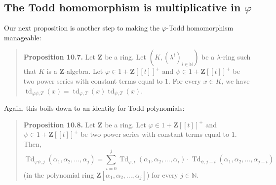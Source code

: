 \documentclass[numbers=enddot,12pt,final,onecolumn,notitlepage]{scrartcl}%
\begin{document}
\subsection{The Todd homomorphism is multiplicative in $\varphi$}

Our next proposition is another step to making the $\varphi$-Todd homomorphism manageable:

\begin{quote}
\textbf{Proposition 10.7.} Let $\mathbf{Z}$ be a ring. Let $\left(  K,\left(
\lambda^{i}\right)  _{i\in\mathbb{N}}\right)  $ be a $\lambda$-ring such that
$K$ is a $\mathbf{Z}$-algebra. Let $\varphi\in1+\mathbf{Z}\left[  \left[
t\right]  \right]  ^{+}$ and $\psi\in1+\mathbf{Z}\left[  \left[  t\right]
\right]  ^{+}$ be two power series with constant terms equal to $1$. For every
$x\in K$, we have $\operatorname*{td}\nolimits_{\varphi\psi,T}\left(
x\right)  =\operatorname*{td}\nolimits_{\varphi,T}\left(  x\right)
\operatorname*{td}\nolimits_{\psi,T}\left(  x\right)  $.
\end{quote}

Again, this boils down to an identity for Todd polynomials:

\begin{quote}
\textbf{Proposition 10.8.} Let $\mathbf{Z}$ be a ring. Let $\varphi
\in1+\mathbf{Z}\left[  \left[  t\right]  \right]  ^{+}$ and $\psi
\in1+\mathbf{Z}\left[  \left[  t\right]  \right]  ^{+}$ be two power series
with constant terms equal to $1$. Then,%
\[
\operatorname*{Td}\nolimits_{\varphi\psi,j}\left(  \alpha_{1},\alpha
_{2},...,\alpha_{j}\right)  =\sum\limits_{i=0}^{j}\operatorname*{Td}%
\nolimits_{\varphi,i}\left(  \alpha_{1},\alpha_{2},...,\alpha_{i}\right)
\cdot\operatorname*{Td}\nolimits_{\psi,j-i}\left(  \alpha_{1},\alpha
_{2},...,\alpha_{j-i}\right)
\]
(in the polynomial ring $\mathbf{Z}\left[  \alpha_{1},\alpha_{2}%
,...,\alpha_{j}\right]  $) for every $j\in\mathbb{N}$.
\end{quote}
\end{document}
